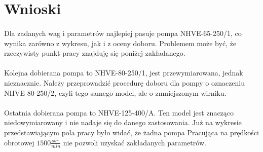 \section{Wnioski}
\paragraph{}{Dla zadanych wag i parametrów najlepiej pasuje pompa NHVE-65-250/1, co wynika zarówno z wykresu, jak i z oceny doboru.
Problemem może być, że rzeczywisty punkt pracy znajduję się poniżej zakładanego.}
\paragraph{}{Kolejna dobierana pompa to NHVE-80-250/1, jest przewymiarowana, jednak nieznacznie. Należy przeprowadzić procedurę doboru dla pompy o oznaczeniu NHVE-80-250/2, czyli tego samego model, ale o zmniejszonym wirniku.}
\paragraph{}{Ostatnia dobierana pompa to NHVE-125-400/A. Ten model jest znacząco niedowymiarowany i nie nadaje się do danego zastosowania. Już na wykresie przedstawiającym pola pracy było widać, że żadna pompa Pracująca na prędkości obrotowej  \(1500\frac{obr.}{min}\) nie pozwoli uzyskać zakładanych parametrów.}
